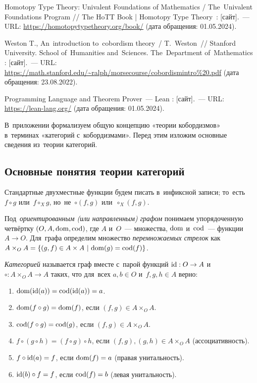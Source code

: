 \documentclass[a4paper,oneside]{article}
\def\oldbibitem{} \let\oldbibitem=\bibitem
\def\bibitem{\stepcounter{citenum}\oldbibitem}
\begin{document}
\begin{thebibliography}{99}
 Homotopy Type Theory: Univalent Foundations of Mathematics / The~{Uni\-va\-lent} Foundations Program //
The HoTT Book | Homotopy Type {The\-o\-ry}~: [сайт].~— URL: \url{https://homotopytypetheory.org/book/} (дата обращения: 01.05.2024).

 Weston T., An~introduction to~cobordism theory~/ T.~Weston~//
{Stan\-ford} University. School of~Humanities and~Sciences.
The~Department of~{Math\-e\-mat\-ics} : [сайт].~— URL: \url{https://math.stanford.edu/~ralph/morsecourse/cobordismintro%20.pdf} (дата обращения: 23.08.2022).

 Programming Language and Theorem Prover~— Lean : [сайт].~— URL: \url{https://lean-lang.org/} (дата обращения: 01.05.2024).

\end{thebibliography}

\label{TheEnd}
\pagebreak

\renewcommand*{\theHsection}{appendix.\arabic{section}}

\renewcommand{\thesection}{\Alph{section}}
\setcounter{section}{1}
\setcounter{subsection}{0}

В~приложении формализуем общую концепцию «теории кобордизмов» в~терминах «категорий с~кобордизмами».
Перед этим изложим основные сведения из~теории категорий.

\subsection{Основные понятия теории категорий}
Стандартные двухместные функции будем писать в~инфиксной записи; то~есть $f \circ g$ или~$f \circ_X g$, но~не~$\circ(f, g)$ или~$\circ_X(f, g)$.

Под~\textit{ориентированным (или направленным) графом} \cite{MacLane71} понимаем упорядоченную четвёртку $(O,\allowbreak A,\allowbreak \mathrm{dom},\allowbreak \mathrm{cod})$,
где $A$ и~$O$~— множества, $\mathrm{dom}$ и~$\mathrm{cod}$~— функции $A \rightarrow O$.
Для~графа определим множество \textit{перемножаемых стрелок} как $A \times_O A = \{ (g, f) \in A \times A \ |\ \dom(g) = \cod(f) \}$.

\textit{Категорией} называется граф вместе с~парой функций $\mathrm{id} : O \rightarrow A$
и~$\circ : A \times_O A \rightarrow A$ таких, что для~всех $a, b \in O$ и~$f, g, h \in A$ верно:
\begin{enumerate}
  \item $\mathrm{dom}(\mathrm{id}(a)) = \mathrm{cod}(\mathrm{id}(a)) = a$.
  \item $\mathrm{dom}(f \circ g) = \mathrm{dom}(f)$, если $(f, g) \in A \times_O A$.
  \item $\mathrm{cod}(f \circ g) = \mathrm{cod}(g)$, если $(f, g) \in A \times_O A$.
  \item $f \circ (g \circ h) = (f \circ g) \circ h$, если $(f, g), (g, h) \in A \times_O A$ (ассоциативность).
  \item $f \circ \mathrm{id}(a) = f$, если $\mathrm{dom}(f) = a$ (правая унитальность).
  \item $\mathrm{id}(b) \circ f = f$, если $\mathrm{cod}(f) = b$ (левая унитальность).
\end{enumerate}
\end{document}
